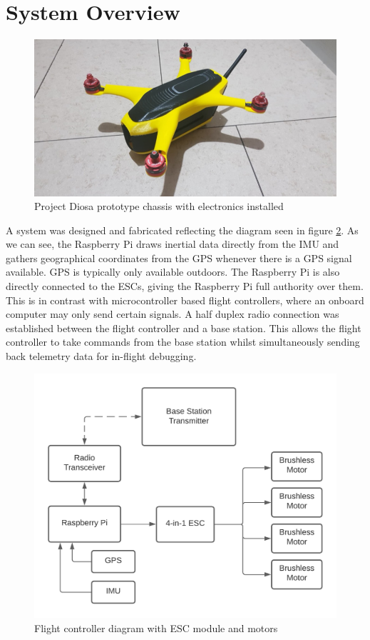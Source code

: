\documentclass[english]{upeeei}
\begin{document}
\section{System Overview}
\begin{figure}[h]
    \centering
    \includegraphics[scale=0.5]{images/diosa_full.PNG}
    \caption{Project Diosa prototype chassis with electronics installed}
    \label{fig:diosa_full}
\end{figure}
A system was designed and fabricated reflecting the diagram seen in figure \ref{fig:final_FC_diagram_na}. As we can see,
the Raspberry Pi draws inertial data directly from the IMU and gathers geographical coordinates from the GPS whenever there is a GPS
signal available. GPS is typically only available outdoors. The Raspberry Pi is also directly connected to the ESCs, giving
the Raspberry Pi full authority over them. This is in contrast with microcontroller based flight controllers, where an onboard computer
may only send certain signals. A half duplex radio connection was established between the flight controller and a base station. 
This allows the flight controller to take commands from the base station whilst simultaneously sending back telemetry data for 
in-flight debugging.
\begin{figure}[h]
    \centering
    \includegraphics[scale=0.5]{images/FC diagram_finalna.png}
    \caption{Flight controller diagram with ESC module and motors}
    \label{fig:final_FC_diagram_na}
\end{figure}
\end{document}
